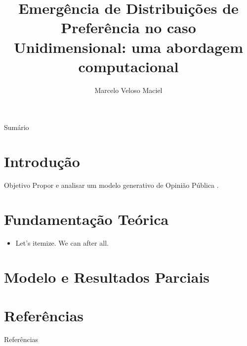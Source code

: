 \documentclass{beamer}
\title{Emergência de Distribuições de Preferência no caso Unidimensional: uma
  abordagem computacional}
\date{}
\author{Marcelo Veloso Maciel}
\institute{}
\begin{document}
\maketitle



\begin{frame}{Sumário}
\tableofcontents
\end{frame}



  \section{Introdução}
  \begin{frame}{Objetivo}
    Propor e analisar um modelo generativo de Opinião Pública \cite{weisberg2012simulation}.
  \end{frame}



\section{Fundamentação Teórica}
\begin{frame}
  \begin{itemize}
  \item Let's itemize. We can after all.
  \end{itemize}
\end{frame}



\section{Modelo e Resultados Parciais}
\begin{frame}
  
\end{frame}






\section*{Referências}
\begin{frame}[allowframebreaks]{Referências}
\printbibliography[heading=none]
\end{frame}
\end{document}
